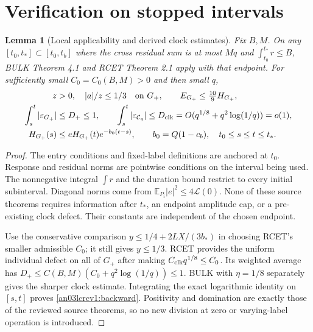\documentclass[11pt]{article}
\newtheorem{lemma}[theorem]{Lemma}
\theoremstyle{remark}\newtheorem{remark}[theorem]{Remark}
\newcommand{\E}{\mathbb E}
\newcommand{\Gp}{G_+}
\newcommand{\Cl}{\mathcal C_q}
\begin{document}
\section{Verification on stopped intervals}
\begin{lemma}[Local applicability and derived clock estimates]
\label{an03lcrcv1:localclock}
Fix $B,M$. On any $[t_0,t_*]\subset[t_0,t_b]$ where the cross
residual sum is at most $Mq$ and $\int_{t_0}^{t_*}r\le B$,
BULK Theorem 4.1 and RCET Theorem 2.1 apply with that endpoint.
For sufficiently small $C_0=C_0(B,M)>0$ and then small $q$,
\begin{align}
 z&>0,\quad |a|/z\le1/3\quad\hbox{on }\Gp,
 \qquad E_{\Gp}\le\tfrac{10}{9}H_{\Gp},
 \label{an03lcrcv1:signgood}\\
 \int_s^t|\varepsilon_{\Gp}|&\le D_+\le1,
 \qquad \int_s^t|\varepsilon_{\Cl}|
 \le D_{\rm clk}=O(q^{1/8}+q^2\log(1/q))=o(1),
 \label{an03lcrcv1:defects}\\
 H_{\Gp}(s)&\le e H_{\Gp}(t)e^{-b_0(t-s)},
 \qquad b_0=Q(1-c_b),\quad t_0\le s\le t\le t_*.
 \label{an03lcrcv1:backward}
\end{align}
\end{lemma}
\begin{proof}
The entry conditions and fixed-label definitions are anchored at
$t_0$. Response and residual norms are pointwise conditions on the
interval being used. The nonnegative integral $\int r$ and the
duration bound restrict to every initial subinterval. Diagonal norms
come from $\E_{P_i}|e|^2\le4\mathcal L(0)$. None of these source
theorems requires information after $t_*$, an endpoint amplitude
cap, or a pre-existing clock defect. Their constants are independent
of the chosen endpoint.

Use the conservative comparison
$y\le1/4+2LX/(3b_*)$ in choosing RCET's smaller admissible $C_0$;
it still gives $y\le1/3$. RCET provides the uniform individual
defect on all of $\Gp$ after making
$C_{\rm clk}q^{1/8}\le C_0$. Its weighted average has
$D_+\le C(B,M)(C_0+q^2\log(1/q))\le1$.
BULK with $\eta=1/8$ separately gives the sharper clock estimate.
Integrating the exact logarithmic identity on $[s,t]$ proves
\eqref{an03lcrcv1:backward}. Positivity and domination are exactly
those of the reviewed source theorems, so no new division at zero
or varying-label operation is introduced.
\end{proof}
\end{document}
